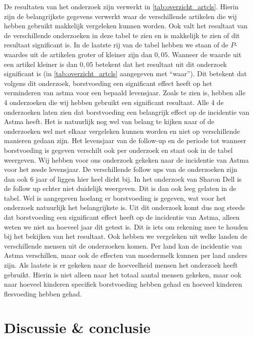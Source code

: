\documentclass[abstract=true]{scrartcl}
\begin{document}
De resultaten van het onderzoek zijn verwerkt in \cref{tab:overzicht_artcls}. Hierin zijn de belangrijkste gegevens verwerkt waar de verschillende artikelen die wij hebben gebruikt makkelijk vergeleken kunnen worden. Ook valt het resultaat van de verschillende onderzoeken in deze tabel te zien en is makkelijk te zien of dit resultaat significant is. In de laatste rij van de tabel hebben we staan of de $P$-waardes uit de artikelen groter of kleiner zijn dan $0,05$. Wanneer de waarde uit een artikel kleiner is dan $0,05$ betekent dat het resultaat uit dit onderzoek significant is (in \cref{tab:overzicht_artcls} aangegeven met “waar”). Dit betekent dat volgens dit onderzoek, borstvoeding een significant effect heeft op het verminderen van astma voor een bepaald levensjaar. Zoals te zien is, hebben alle 4 onderzoeken die wij hebben gebruikt een significant resultaat. Alle 4 de onderzoeken laten zien dat borstvoeding een belangrijk effect op de incidentie van Astma heeft. Het is natuurlijk nog wel van belang te kijken naar of de onderzoeken wel met elkaar vergeleken kunnen worden en niet op verschillende manieren gedaan zijn. Het levensjaar van de follow-up en de periode tot wanneer borstvoeding is gegeven verschilt ook per onderzoek en staat ook in de tabel weergeven. Wij hebben voor ons onderzoek gekeken naar de incidentie van Astma voor het zesde levensjaar. De verschillende follow ups van de onderzoeken zijn dan ook 6 jaar of liggen hier heel dicht bij. In het onderzoek van Sharon Dell is de follow up echter niet duidelijk weergeven. Dit is dan ook leeg gelaten in de tabel. Wel is aangegeven hoelang er borstvoeding is gegeven, wat voor het onderzoek natuurlijk het belangrijkste is. Uit dit onderzoek komt dus nog steeds dat borstvoeding een significant effect heeft op de incidentie van Astma, alleen weten we niet na hoeveel jaar dit getest is. Dit is iets om rekening mee te houden bij het bekijken van het resultaat. Ook hebben we vergeleken uit welke landen de verschillende mensen uit de onderzoeken komen. Per land kan de incidentie van Astma verschillen, maar ook de effecten van moedermelk kunnen per land anders zijn. Als laatste is er gekeken naar de hoeveelheid mensen het onderzoek heeft gebruikt. Hierin is niet alleen naar het totaal aantal mensen gekeken, maar ook naar hoeveel kinderen specifiek borstvoeding hebben gehad en hoeveel kinderen flesvoeding hebben gehad. 

\section{Discussie \& conclusie}
\end{document}
